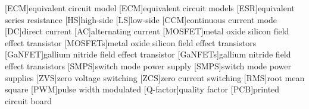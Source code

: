 
\begin{acronym}[IWESsss] %
        [ECM]{equivalent circuit model}
        [ECM]{equivalent circuit models}
        [ESR]{equivalent series resistance}
        [HS]{high-side}
        [LS]{low-side}
        [CCM]{continuous current mode}
        [DC]{direct current}
        [AC]{alternating current}
        [MOSFET]{metal oxide silicon field effect transistor}
        [MOSFETs]{metal oxide silicon field effect transistors}
        [GaNFET]{gallium nitride field effect transistor}
        [GaNFETs]{gallium nitride field effect transistors}
        [SMPS]{switch mode power supply}
        [SMPS]{switch mode power supplies}
        [ZVS]{zero voltage switching}
        [ZCS]{zero current switching}
        [RMS]{root mean square}
        [PWM]{pulse width modulated}
        [Q-factor]{quality factor}
        [PCB]{printed circuit board}
\end{acronym}
\thispagestyle{empty}
